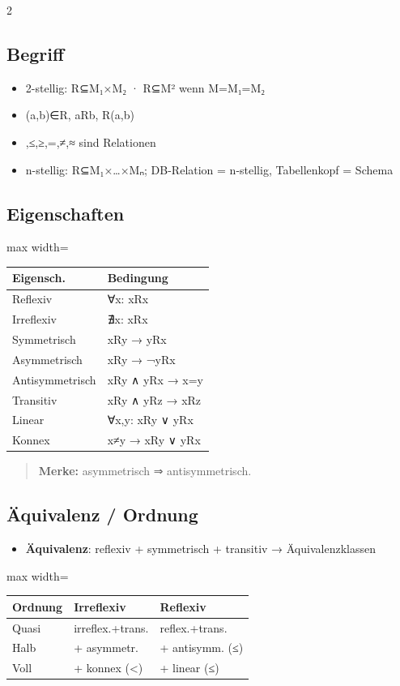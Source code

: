 \documentclass[10pt, a4paper]{article}
\begin{document}
\begin{multicols}{2}
\subsection{Begriff}
\begin{itemize}
  \item 2-stellig: R⊆M₁×M₂ · R⊆M² wenn M=M₁=M₂
  \item (a,b)∈R, aRb, R(a,b)
  \item <,>,≤,≥,=,≠,≈ sind Relationen
  \item n-stellig: R⊆M₁×…×Mₙ; DB-Relation = n-stellig, Tabellenkopf = Schema
\end{itemize}


\subsection{Eigenschaften}

{\small
\begin{adjustbox}{max width=\linewidth}
{\scriptsize
\begin{tabular}{ll}
\toprule
\textbf{Eigensch.} & \textbf{Bedingung} \\
\midrule
Reflexiv & ∀x: xRx \\
Irreflexiv & ∄x: xRx \\
Symmetrisch & xRy → yRx \\
Asymmetrisch & xRy → ¬yRx \\
Antisymmetrisch & xRy ∧ yRx → x=y \\
Transitiv & xRy ∧ yRz → xRz \\
Linear & ∀x,y: xRy ∨ yRx \\
Konnex & x≠y → xRy ∨ yRx \\
\bottomrule
\end{tabular}
}
\end{adjustbox}
}


\begin{quote}
\textbf{Merke:} asymmetrisch ⇒ antisymmetrisch.
\end{quote}


\subsection{Äquivalenz / Ordnung}
\begin{itemize}
  \item \textbf{Äquivalenz}: reflexiv + symmetrisch + transitiv → Äquivalenzklassen
\end{itemize}


{\small
\begin{adjustbox}{max width=\linewidth}
{\scriptsize
\begin{tabular}{lll}
\toprule
\textbf{Ordnung} & \textbf{Irreflexiv} & \textbf{Reflexiv} \\
\midrule
Quasi & irreflex.+trans. & reflex.+trans. \\
Halb & + asymmetr. & + antisymm. (≤) \\
Voll & + konnex (<) & + linear (≤) \\
\bottomrule
\end{tabular}
}
\end{adjustbox}
}



\end{multicols}
\end{document}

